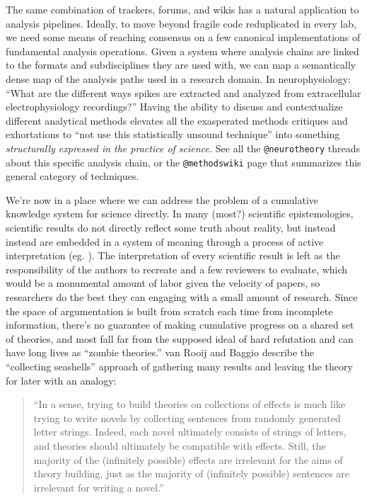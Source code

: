 \documentclass[10pt]{tufte-book}
\begin{document}
The same combination of trackers, forums, and wikis has a natural
application to analysis pipelines. Ideally, to move beyond fragile code
reduplicated in every lab, we need some means of reaching consensus on a
few canonical implementations of fundamental analysis operations. Given
a system where analysis chains are linked to the formats and
subdisciplines they are used with, we can map a semantically dense map
of the analysis paths used in a research domain. In neurophysiology:
``What are the different ways spikes are extracted and analyzed from
extracellular electrophysiology recordings?'' Having the ability to
discuss and contextualize different analytical methods elevates all the
exasperated methods critiques and exhortations to ``not use this
statistically unsound technique'' into something \emph{structurally
expressed in the practice of science.} See all the \texttt{@neurotheory}
threads about this specific analysis chain, or the \texttt{@methodswiki}
page that summarizes this general category of techniques.

We're now in a place where we can address the problem of a cumulative
knowledge system for science directly. In many (most?) scientific
epistemologies, scientific results do not directly reflect some truth
about reality, but instead instead are embedded in a system of meaning
through a process of active interpretation (eg. \citep{meehlTheoreticalRisksTabular1978} ). The interpretation of every
scientific result is left as the responsibility of the authors to
recreate and a few reviewers to evaluate, which would be a monumental
amount of labor given the velocity of papers, so researchers do the best
they can engaging with a small amount of research. Since the space of
argumentation is built from scratch each time from incomplete
information, there's no guarantee of making cumulative progress on a
shared set of theories, and most fall far from the supposed ideal of
hard refutation and can have long lives as ``zombie theories.'' van
Rooij and Baggio describe the ``collecting seashells'' approach of
gathering many results and leaving the theory for later with an analogy:

\begin{quote}
``In a sense, trying to build theories on collections of effects is much
like trying to write novels by collecting sentences from randomly
generated letter strings. Indeed, each novel ultimately consists of
strings of letters, and theories should ultimately be compatible with
effects. Still, the majority of the (infinitely possible) effects are
irrelevant for the aims of theory building, just as the majority of
(infinitely possible) sentences are irrelevant for writing a novel.''
\citep{vanrooijTheoryTestHow2021} 
\end{quote}
\end{document}
